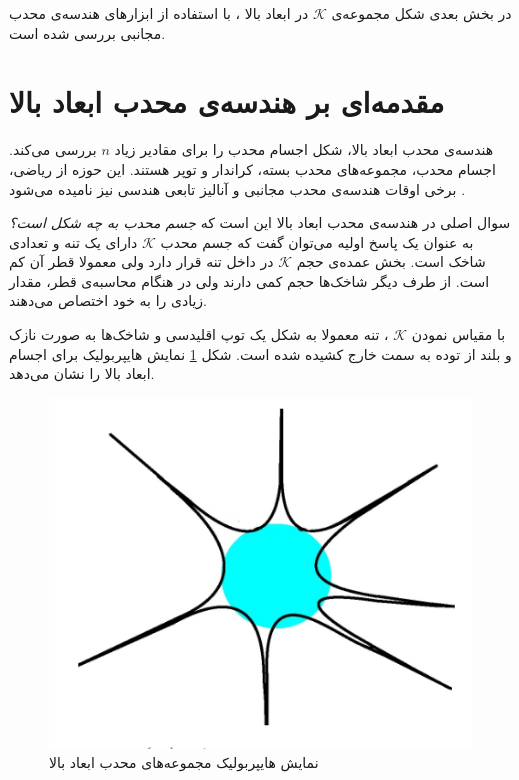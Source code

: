 در بخش بعدی شکل مجموعه‌ی 
$\mathcal{K}$
در ابعاد بالا ، با استفاده از ابزار‌های هندسه‌ی محدب مجانبی بررسی شده است.

\section{مقدمه‌ای بر هندسه‌ی محدب ابعاد بالا}
هندسه‌ی محدب ابعاد بالا، شکل اجسام
 محدب را برای مقادیر زیاد 
$n$
بررسی می‌کند. اجسام محدب، مجموعه‌های محدب بسته، کراندار و توپر هستند. این حوزه از ریاضی، برخی اوقات هندسه‌ی محدب مجانبی و آنالیز تابعی هندسی
نیز نامیده می‌شود
\cite{ball1997elementary,brazitikos2014geometry,pisier1999volume}.


سوال اصلی در هندسه‌ی محدب ابعاد بالا این است که 
\textit{جسم محدب به چه شکل است؟}
به عنوان یک پاسخ اولیه می‌توان گفت که جسم محدب
$\mathcal{K}$
دارای یک تنه
و تعدادی شاخک 
است. بخش عمده‌ی حجم 
$\mathcal{K}$
در داخل تنه قرار دارد ولی معمولا قطر آن کم است. از طرف دیگر شاخک‌ها حجم کمی دارند ولی در هنگام محاسبه‌ی قطر، مقدار زیادی را به خود اختصاص می‌دهند.

با مقیاس نمودن 
$\mathcal{K}$
، تنه معمولا به شکل یک توپ اقلیدسی و شاخک‌ها به صورت نازک و بلند از توده به سمت خارج کشیده شده است. شکل
\ref{fig5}
نمایش هایپربولیک برای اجسام ابعاد بالا را نشان می‌دهد.
\begin{figure}
\centering
\includegraphics[scale=0.3]{Images/ch2/fig5.png}
\caption{نمایش هایپربولیک مجموعه‌های محدب ابعاد بالا\cite{Plan2016}}
\label{fig5}
\end{figure}

